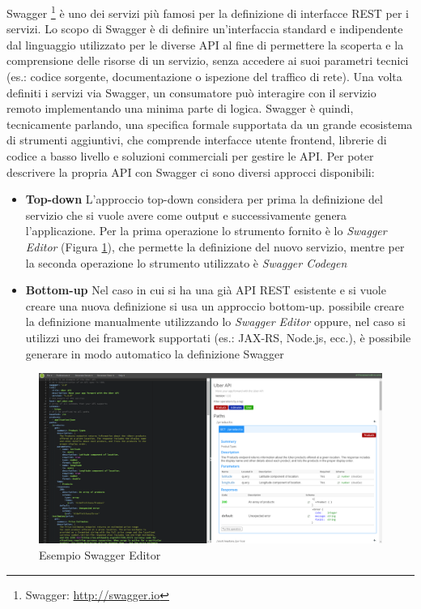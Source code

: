 Swagger \footnote{Swagger: \url{http://swagger.io}} è uno dei servizi più famosi per la definizione di interfacce REST per i servizi.
Lo scopo di Swagger è di definire un'interfaccia standard e indipendente dal linguaggio utilizzato per le diverse API al fine di permettere la scoperta e la comprensione delle risorse di un servizio, senza accedere ai suoi parametri tecnici (es.: codice sorgente, documentazione o ispezione del traffico di rete). Una volta definiti i servizi via Swagger, un consumatore può interagire con il servizio remoto implementando una minima parte di logica.
Swagger è quindi, tecnicamente parlando, una specifica formale supportata da un grande ecosistema di strumenti aggiuntivi, che comprende interfacce utente frontend, librerie di codice a basso livello e soluzioni commerciali per gestire le API.
Per poter descrivere la propria API con Swagger ci sono diversi approcci disponibili:

\begin{itemize}
	\item \textbf{Top-down}
	L'approccio top-down considera per prima la definizione del servizio che si vuole avere come output e successivamente genera l'applicazione. Per la prima operazione lo strumento fornito è lo \emph{Swagger Editor} (Figura \ref{fig:swagger}), che permette la definizione del nuovo servizio, mentre per la seconda operazione lo strumento utilizzato è \emph{Swagger Codegen}
	\item \textbf{Bottom-up}
	Nel caso in cui si ha una già API REST esistente e si vuole creare una nuova definizione si usa un approccio bottom-up. \upe possibile creare la definizione manualmente utilizzando lo \emph{Swagger Editor} oppure, nel caso si utilizzi uno dei framework supportati (es.: JAX-RS, Node.js, ecc.), è possibile generare in modo automatico la definizione Swagger
\end{itemize}

\begin{figure}[ht]
	\centering
	\includegraphics[width=\textwidth]{2-preliminari/Immagini/swagger.png}
	\caption{Esempio Swagger Editor}\label{fig:swagger}
\end{figure}

